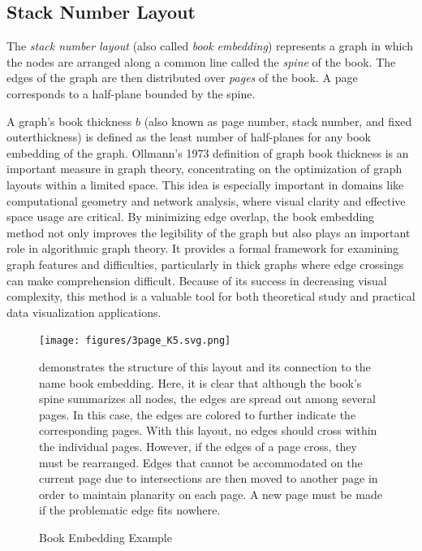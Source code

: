 \documentclass[bachelor, english]{algothesis}
\begin{document}
\subsection{Stack Number Layout}
\begin{definition}
    The \emph{stack number layout} (also called \emph{book embedding}) represents a graph in which the nodes are arranged along a common line called the \emph{spine} of the book. The edges of the graph are then distributed over \emph{pages} of the book. A page corresponds to a half-plane bounded by the spine.
\end{definition}
\noindent
A graph's book thickness $b$ (also known as page number, stack number, and fixed outerthickness) is defined as the least number of half-planes for any book embedding of the graph. Ollmann's 1973 definition \cite{book_thickness} of graph book thickness is an important measure in graph theory, concentrating on the optimization of graph layouts within a limited space. This idea is especially important in domains like computational geometry and network analysis, where visual clarity and effective space usage are critical. \newline
By minimizing edge overlap, the book embedding method not only improves the legibility of the graph but also plays an important role in algorithmic graph theory. It provides a formal framework for examining graph features and difficulties, particularly in thick graphs where edge crossings can make comprehension difficult. Because of its success in decreasing visual complexity, this method is a valuable tool for both theoretical study and practical data visualization applications. 

\begin{figure}[ht]
  \begin{minipage}{0.5\textwidth}
    \centering
    \texttt{[image: figures/3page\_K5.svg.png]}
    \caption{Book Embedding Example \protect\footnotemark}
    \label{fig:BE_Example}
  \end{minipage}
  \begin{minipage}{0.5\textwidth}
     demonstrates the structure of this layout and its connection to the name book embedding. Here, it is clear that although the book's spine summarizes all nodes, the edges are spread out among several pages. In this case, the edges are colored to further indicate the corresponding pages. With this layout, no edges should cross within the individual pages. However, if the edges of a page cross, they must be rearranged. Edges that cannot be accommodated on the current page due to intersections are then moved to another page in order to maintain planarity on each page. A new page must be made if the problematic edge fits nowhere. 
  \end{minipage}
\end{figure}
\end{document}
